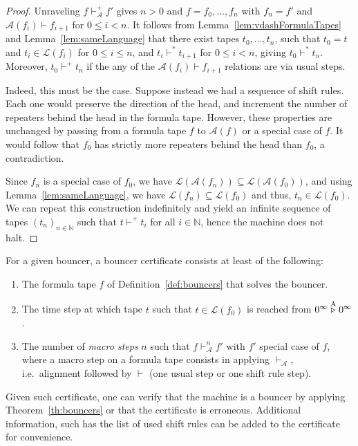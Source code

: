 \begin{proof}
    Unraveling $f \vdash_\mathcal{A}^+ f'$ gives $n>0$ and $f=f_0, \dots, f_n$ with $f_n = f'$ and $\mathcal{A}(f_i) \vdash f_{i+1}$ for $0 \leq i < n$.
    It follows from Lemma~\ref{lem:vdashFormulaTapes} and Lemma~\ref{lem:sameLanguage} that there exist tapes $t_0, \dots, t_n$, such that $t_0 = t$ and $t_i\in \mathcal{L}(f_i)$ for $0 \leq i \leq n$, and $t_i \vdash^* t_{i+1}$ for $0 \leq i < n$, giving $t_0 \vdash^* t_n$. Moreover, $t_0 \vdash^+ t_n$ if the any of the $\mathcal{A}(f_i) \vdash f_{i+1}$ relations are via usual steps.

    Indeed, this must be the case. Suppose instead we had a sequence of shift rules. Each one would preserve the direction of the head, and increment the number of repeaters behind the head in the formula tape. However, these properties are unchanged by passing from a formula tape $f$ to $\mathcal{A}(f)$ or a special case of $f$. It would follow that $f_0$ has strictly more repeaters behind the head than $f_0$, a contradiction.

    Since $f_n$ is a special case of $f_0$, we have $\mathcal{L}(\mathcal{A}(f_n)) \subseteq \mathcal{L}(\mathcal{A}(f_0))$, and using Lemma~\ref{lem:sameLanguage}, we have $\mathcal{L}(f_n) \subseteq \mathcal{L}(f_0)$ and thus, $t_n \in \mathcal{L}(f_0)$. We can repeat this construction indefinitely and yield an infinite sequence of tapes $(t_n)_{n\in\mathbb{N}}$ such that $t \vdash^+ t_i$ for all $i\in\mathbb{N}$, hence the machine does not halt.
\end{proof}



\begin{definition}\label{def:bouncer-certificate}
    For a given bouncer, a bouncer certificate consists at least of the following:
    \begin{enumerate}
        \item The formula tape $f$ of Definition~\ref{def:bouncers} that solves the bouncer.
        \item The time step at which tape $t$ such that $t\in\mathcal{L}(f_0)$ is reached from  $0^\infty \stackrel{\text{A}}\triangleright 0^\infty$.
        \item The number of \textit{macro steps} $n$ such that $f \vdash_\mathcal{A}^n f'$ with $f'$ special case of $f$, where a macro step on a formula tape consists in applying $\vdash_\mathcal{A}$, i.e.\ alignment followed by $\vdash$ (one usual step or one shift rule step).
    \end{enumerate}
    Given such certificate, one can verify that the machine is a bouncer by applying Theorem~\ref{th:bouncers} or that the certificate is erroneous. Additional information, such has the list of used shift rules can be added to the certificate for convenience.
\end{definition}


